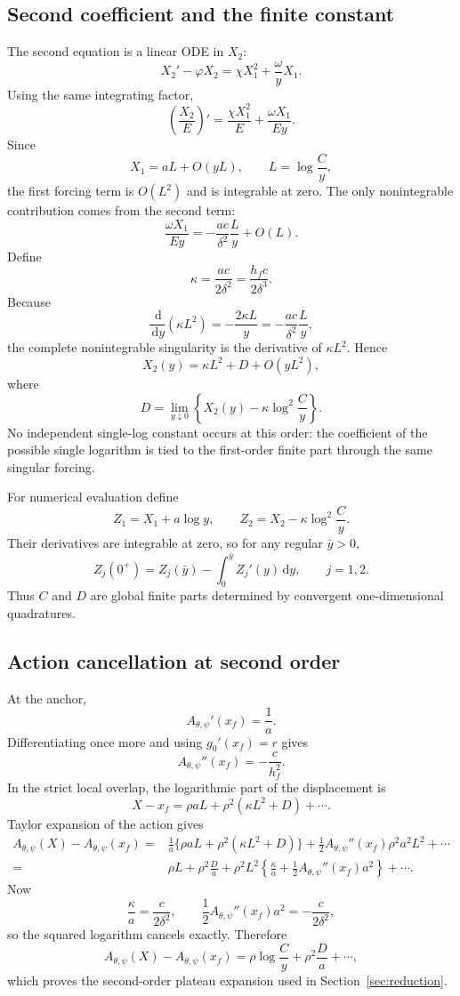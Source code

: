 \documentclass[11pt]{article}
\newcommand{\Apsi}{A_{\theta,\psi}}
\newcommand{\xf}{x_f}
\newcommand{\dd}{\,\mathrm{d}}
\newcommand{\gh}{g_0}
\begin{document}
\subsection{Second coefficient and the finite constant}
The second equation is a linear ODE in $X_2$:
\[
X_2'-\varphi X_2
=\chi X_1^2+\frac\omega yX_1.
\]
Using the same integrating factor,
\[
\boxed{
\left(\frac{X_2}{E}\right)'
=\frac{\chi X_1^2}{E}
+\frac{\omega X_1}{Ey}.
}
\]
Since
\[
X_1=aL+O(yL),
\qquad
L=\log\frac C y,
\]
the first forcing term is $O(L^2)$ and is integrable at zero. The only nonintegrable contribution comes from the second term:
\[
\frac{\omega X_1}{Ey}
=-\frac{ac}{\delta^2}\frac L y+O(L).
\]
Define
\[
\boxed{
\kappa=\frac{ac}{2\delta^2}
=\frac{h_fc}{2\delta^3}.
}
\]
Because
\[
\frac{\dd}{\dd y}(\kappa L^2)
=-\frac{2\kappa L}{y}
=-\frac{ac}{\delta^2}\frac L y,
\]
the complete nonintegrable singularity is the derivative of $\kappa L^2$. Hence
\[
\boxed{
X_2(y)=\kappa L^2+D+O(yL^2),
}
\]
where
\[
\boxed{
D=\lim_{y\downarrow0}\left\{X_2(y)-\kappa\log^2\frac C y\right\}.
}
\]
No independent single-log constant occurs at this order: the coefficient of the possible single logarithm is tied to the first-order finite part through the same singular forcing.

For numerical evaluation define
\[
Z_1=X_1+a\log y,
\qquad
Z_2=X_2-\kappa\log^2\frac C y.
\]
Their derivatives are integrable at zero, so for any regular $\bar y>0$,
\[
\boxed{
Z_j(0^+)=Z_j(\bar y)-\int_0^{\bar y}Z_j'(y)\dd y,
\qquad j=1,2.
}
\]
Thus $C$ and $D$ are global finite parts determined by convergent one-dimensional quadratures.

\subsection{Action cancellation at second order}
At the anchor,
\[
\Apsi'(\xf)=\frac1a.
\]
Differentiating once more and using $\gh'(\xf)=r$ gives
\[
\boxed{
\Apsi''(\xf)=-\frac c{h_f^2}.
}
\]
In the strict local overlap, the logarithmic part of the displacement is
\[
X-\xf=\rho aL+\rho^2(\kappa L^2+D)+\cdots.
\]
Taylor expansion of the action gives
\[
\begin{aligned}
\Apsi(X)-\Apsi(\xf)
={}&\frac1a\{\rho aL+\rho^2(\kappa L^2+D)\}
+\frac12\Apsi''(\xf)\rho^2a^2L^2+\cdots\\
={}&\rho L
+\rho^2\frac Da
+\rho^2L^2
\left\{
\frac\kappa a+\frac12\Apsi''(\xf)a^2
\right\}
+\cdots.
\end{aligned}
\]
Now
\[
\frac\kappa a=\frac c{2\delta^2},
\qquad
\frac12\Apsi''(\xf)a^2=-\frac c{2\delta^2},
\]
so the squared logarithm cancels exactly. Therefore
\[
\boxed{
\Apsi(X)-\Apsi(\xf)
=\rho\log\frac C y+\rho^2\frac Da+\cdots,
}
\]
which proves the second-order plateau expansion used in Section~\ref{sec:reduction}.
\end{document}
